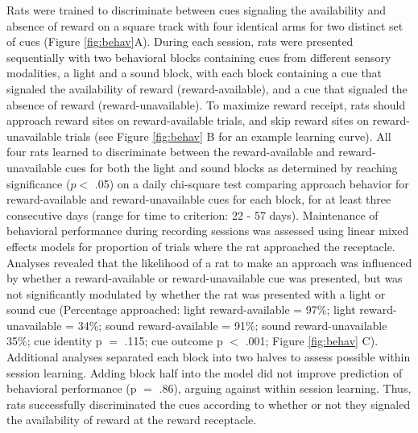 \documentclass[11pt]{article}
\providecommand{\DIFadd}[1]{{\protect\color{red} \sf #1}} %
\providecommand{\DIFdel}[1]{} %
\providecommand{\DIFaddbegin}{} %
\providecommand{\DIFaddend}{} %
\providecommand{\DIFdelbegin}{} %
\providecommand{\DIFdelend}{} %
\newcommand{\DIFscaledelfig}{0.5}
\newlength{\DIFdelgraphicswidth} %
\newlength{\DIFdelgraphicsheight} %
\newcommand{\DIFaddincludegraphics}[2][]{{\color{red}\fbox{\DIFOincludegraphics[#1]{#2}}}} %
\newcommand{\DIFdelincludegraphics}[2][]{%
\sbox{\DIFdelgraphicsbox}{\DIFOincludegraphics[#1]{#2}}%
\settoboxwidth{\DIFdelgraphicswidth}{\DIFdelgraphicsbox} %
\settoboxtotalheight{\DIFdelgraphicsheight}{\DIFdelgraphicsbox} %
\scalebox{\DIFscaledelfig}{%
\parbox[b]{\DIFdelgraphicswidth}{\usebox{\DIFdelgraphicsbox}\\[-\baselineskip] \rule{\DIFdelgraphicswidth}{0em}}\llap{\resizebox{\DIFdelgraphicswidth}{\DIFdelgraphicsheight}{%
\setlength{\unitlength}{\DIFdelgraphicswidth}%
\begin{picture}(1,1)%
\thicklines\linethickness{2pt} %
{\color[rgb]{1,0,0}\put(0,0){\framebox(1,1){}}}%
{\color[rgb]{1,0,0}\put(0,0){\line( 1,1){1}}}%
{\color[rgb]{1,0,0}\put(0,1){\line(1,-1){1}}}%
\end{picture}%
}\hspace*{3pt}}} %
} %
\DeclareRobustCommand{\DIFaddbegin}{\DIFOaddbegin \let\includegraphics\DIFaddincludegraphics} %
\DeclareRobustCommand{\DIFaddend}{\DIFOaddend \let\includegraphics\DIFOincludegraphics} %
\DeclareRobustCommand{\DIFdelbegin}{\DIFOdelbegin \let\includegraphics\DIFdelincludegraphics} %
\DeclareRobustCommand{\DIFdelend}{\DIFOaddend \let\includegraphics\DIFOincludegraphics} %
\begin{document}
Rats were trained to discriminate between cues signaling the
availability and absence of reward on a square track with four
identical arms for two distinct set of cues (Figure
\DIFdelbegin \DIFdel{\ref{fig:task}}\DIFdelend \DIFaddbegin \DIFadd{\ref{fig:behav}A}\DIFaddend ). During each session, rats were presented sequentially
with two behavioral blocks containing cues from different sensory
modalities, a light and a sound block, with each block containing a
cue that \DIFdelbegin \DIFdel{signalled }\DIFdelend \DIFaddbegin \DIFadd{signaled }\DIFaddend the availability of reward (reward-available), and
a cue that \DIFdelbegin \DIFdel{signalled }\DIFdelend \DIFaddbegin \DIFadd{signaled }\DIFaddend the absence of reward (reward-unavailable). To
maximize reward receipt, rats should approach reward sites on
reward-available trials, and skip reward sites on reward-unavailable
trials (see Figure \ref{fig:behav}\DIFdelbegin \DIFdel{A }\DIFdelend \DIFaddbegin \DIFadd{B }\DIFaddend for an example learning
curve). All four rats learned to discriminate between the
reward-available and reward-unavailable cues for both the light and
sound blocks as determined by reaching significance ($p <$ .05) on a
daily chi-square test comparing approach behavior for reward-available
and reward-unavailable cues for each block, for at least three
consecutive days (range for time to criterion: 22 - 57
days). Maintenance of behavioral performance during recording sessions
was assessed using linear mixed effects models for \DIFdelbegin \DIFdel{both }\DIFdelend proportion of
trials where the rat approached the receptacle\DIFdelbegin \DIFdel{, and trial
length}\DIFdelend . Analyses revealed that the likelihood of a rat to make an
approach was influenced by whether a reward-available or
reward-unavailable cue was presented, but was not significantly
modulated by whether the rat was presented with a light or sound cue
(Percentage approached: light reward-available = 97\%; light
reward-unavailable = 34\%; sound reward-available = 91\%; sound
reward-unavailable 35\%; cue identity p $=$ .115; cue outcome p $<$
.001; Figure \ref{fig:behav}\DIFdelbegin \DIFdel{B). A similar trend was seen with the length of time taken to complete a trial (Trial length: light
reward-available = 1.85 s; light reward-unavailable = 1.74 s; sound
reward-available = 1.91 s; sound reward-unavailable 1.78 s; cue identity }\DIFdelend \DIFaddbegin \DIFadd{C). Additional analyses separated each block into two halves to assess possible within session learning. Adding block half into the model did not improve prediction of behavioral performance (}\DIFaddend p $=$ \DIFdelbegin \DIFdel{.106; cue outcome p $<$ .001; Figure \ref{fig:behav}C)}\DIFdelend \DIFaddbegin \DIFadd{.86), arguing against within session learning}\DIFaddend . Thus, \DIFdelbegin \DIFdel{during recording, }\DIFdelend rats successfully
discriminated the cues according to whether or not they signaled the
availability of reward at the reward receptacle.
\end{document}
